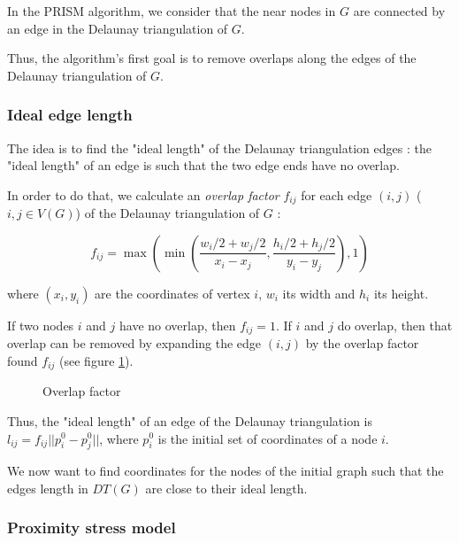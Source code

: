 \documentclass[12pt]{report}
\begin{document}
In the PRISM algorithm, we consider that the near nodes in $G$ are connected by an edge in the Delaunay triangulation of $G$.

Thus, the algorithm's first goal is to remove overlaps along the edges of the Delaunay triangulation of $G$.

\subsubsection{Ideal edge length}
The idea is to find the "ideal length" of the Delaunay triangulation edges : the "ideal length" of an edge is such that the two edge ends have no overlap.

\bigskip
In order to do that, we calculate an \emph{overlap factor} $f_{ij}$ for each edge $(i,j)$ ($i,j \in V(G)$) of the Delaunay triangulation of $G$ :

\[ f_{ij} = \max \left( \min \left(\frac{w_i/2 + w_j/2}{x_i - x_j}, 
\frac{h_i/2 + h_j/2}{y_i - y_j} \right), 1 \right) \label{of}\]

where $(x_i,y_i)$ are the coordinates of vertex $i$, $w_i$ its width and $h_i$ its height.

If two nodes $i$ and $j$ have no overlap, then $f_{ij} = 1$. 
If $i$ and $j$ do overlap, then that overlap can be removed by expanding the edge $(i,j)$ by the overlap factor found $f_{ij}$ (see figure \ref{overlapFactor}). 

\begin{figure}[h]
	\center
  \setlength\fboxsep{5pt}
  \setlength\fboxrule{0.5pt}
  \caption{Overlap factor}
  \label{overlapFactor}
\end{figure}

Thus, the "ideal length" of an edge of the Delaunay triangulation is $l_{ij} = f_{ij}||p_i^0 - p_j^0||$, where $p_i^0$ is the initial set of coordinates of a node $i$.

We now want to find coordinates for the nodes of the initial graph such that the edges length in $DT(G)$ are close to their ideal length.

\subsubsection{Proximity stress model}
\end{document}
